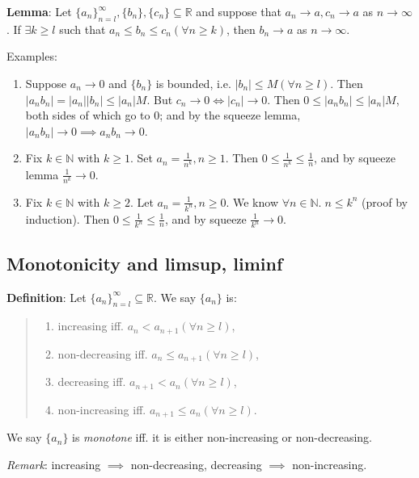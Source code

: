 \documentclass[11pt]{article}
\begin{document}
\textbf{Lemma}: Let $\{a_n\}_{n=l}^\infty, \{b_n\}, \{c_n\} \subseteq \mathbb{R}$ and suppose that $a_n \to a, c_n \to a$ as $n \to \infty$. If $\exists k \geq l$ such that $a_n \leq b_n \leq c_n (\forall n \geq k)$, then $b_n \to a$ as $n \to \infty$.

Examples:
\begin{enumerate}\vspace{-0.3cm}
\item Suppose $a_n \to 0$ and $\{b_n\}$ is bounded, i.e. $|b_n| \leq M (\forall n \geq l)$. Then $|a_n b_n| = |a_n| |b_n| \leq |a_n| M$. But $c_n \to 0 \iff |c_n| \to 0$. Then $0 \leq |a_n b_n| \leq |a_n| M$, both sides of which go to 0; and by the squeeze lemma, $|a_n b_n| \to 0 \implies a_n b_n \to 0$.

\item  Fix $k \in \mathbb{N}$ with $k \geq 1$. Set $a_n = \frac{1}{n^k}, n \geq 1$. Then $0 \leq \frac{1}{n^k} \leq \frac{1}{n}$, and by squeeze lemma $\frac{1}{n^k} \to 0$.

\item Fix $k \in \mathbb{N}$ with $k \geq 2$. Let $a_n = \frac{1}{k^n}, n \geq 0$. We know $\forall n \in \mathbb{N}.\; n \leq k^n$ (proof by induction). Then $0 \leq \frac{1}{k^n} \leq \frac{1}{n}$, and by squeeze $\frac{1}{k^n} \to 0$.
\end{enumerate}

\subsection{Monotonicity and limsup, liminf}

\textbf{Definition}: Let $\{a_n\}_{n=l}^\infty \subseteq \mathbb{R}$. We say $\{a_n\}$ is:
\begin{quote}\vspace{-0.3cm}
	\begin{enumerate}
	\item increasing iff. $a_n < a_{n+1} (\forall n \geq l)$,
	\item non-decreasing iff. $a_n \leq a_{n+1} (\forall n \geq l)$,
	\item decreasing iff. $a_{n+1} < a_n (\forall n \geq l)$,
	\item non-increasing iff. $a_{n+1} \leq a_n (\forall n \geq l)$.
	\end{enumerate}
\end{quote}
We say $\{a_n\}$ is \emph{monotone} iff. it is either non-increasing or non-decreasing.

\emph{Remark}: increasing $\implies$ non-decreasing, decreasing $\implies$ non-increasing.
\end{document}
